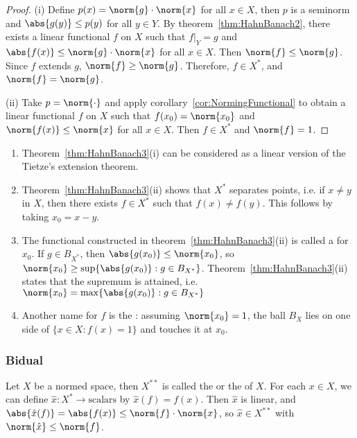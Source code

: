 \documentclass[a4paper]{article}
\begin{document}
\begin{proof}
  (i) Define $p(x)=\norm{g}\cdot\norm{x}$ for all $x\in X$, then $p$ is a seminorm and $\abs{g(y)}\leq p(y)$ for all $y\in Y$. By theorem~\ref{thm:HahnBanach2}, there exists a linear functional $f$ on $X$ such that $f|_Y=g$ and $\abs{f(x)}\leq\norm{g}\cdot\norm{x}$ for all $x\in X$. Then $\norm{f}\leq\norm{g}$. Since $f$ extends $g$, $\norm{f}\geq\norm{g}$. Therefore, $f\in X^*$, and $\norm{f}=\norm{g}$.

  (ii) Take $p=\norm{\cdot}$ and apply corollary~\ref{cor:NormingFunctional} to obtain a linear functional $f$ on $X$ such that $f(x_0)=\norm{x_0}$ and $\norm{f(x)}\leq\norm{x}$ for all $x\in X$. Then $f\in X^*$ and $\norm{f}=1$.
\end{proof}

\begin{remark}
  \begin{enumerate}[label=(\arabic*)]
    \item Theorem~\ref{thm:HahnBanach3}(i) can be considered as a linear version of the Tietze's extension theorem.
    \item Theorem~\ref{thm:HahnBanach3}(ii) shows that $X^*$ separates points, i.e. if $x\not= y$ in $X$, then there exists $f\in X^*$ such that $f(x)\not= f(y)$. This follows by taking $x_0=x-y$.
    \item The functional constructed in theorem~\ref{thm:HahnBanach3}(ii) is called a  for $x_0$. If $g\in B_{X^*}$, then $\abs{g(x_0)}\leq\norm{x_0}$, so $\norm{x_0}\geq\sup\{\abs{g(x_0)}:g\in B_{X^*}\}$. Theorem~\ref{thm:HahnBanach3}(ii) states that the supremum is attained, i.e. $\norm{x_0}=\max\{\abs{g(x_0)}:g\in B_{X^*}\}$
    \item Another name for $f$ is the : assuming $\norm{x_0}=1$, the ball $B_X$ lies on one side of $\{x\in X:f(x)=1\}$ and touches it at $x_0$.
  \end{enumerate}
\end{remark}

\subsubsection*{Bidual}
Let $X$ be a normed space, then $X^{**}$ is called the  or the  of $X$. For each $x\in X$, we can define $\hat{x}:X^*\to\mathrm{scalars}$ by $\hat{x}(f)=f(x)$. Then $\hat{x}$ is linear, and $\abs{\hat{x}(f)}=\abs{f(x)}\leq\norm{f}\cdot\norm{x}$, so $\hat{x}\in X^{**}$ with $\norm{\hat{x}}\leq\norm{f}$.
\end{document}

